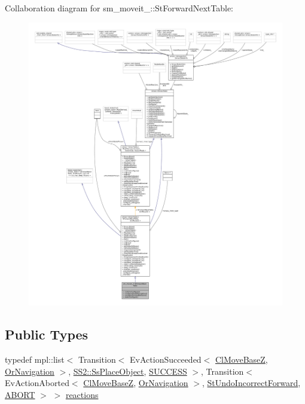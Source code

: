 Collaboration diagram for sm\+\_\+moveit\+\_\+:\+:St\+Forward\+Next\+Table\+:
\nopagebreak
\begin{figure}[H]
\begin{center}
\leavevmode
\includegraphics[width=350pt]{structsm__moveit__2_1_1StForwardNextTable__coll__graph}
\end{center}
\end{figure}
\subsection*{Public Types}
\begin{DoxyCompactItemize}
\item 
typedef mpl\+::list$<$ Transition$<$ Ev\+Action\+Succeeded$<$ \hyperlink{classcl__move__base__z_1_1ClMoveBaseZ}{Cl\+Move\+BaseZ}, \hyperlink{classsm__moveit__2_1_1OrNavigation}{Or\+Navigation} $>$, \hyperlink{structsm__moveit__2_1_1SS2_1_1SsPlaceObject}{S\+S2\+::\+Ss\+Place\+Object}, \hyperlink{classSUCCESS}{S\+U\+C\+C\+E\+SS} $>$, Transition$<$ Ev\+Action\+Aborted$<$ \hyperlink{classcl__move__base__z_1_1ClMoveBaseZ}{Cl\+Move\+BaseZ}, \hyperlink{classsm__moveit__2_1_1OrNavigation}{Or\+Navigation} $>$, \hyperlink{structsm__moveit__2_1_1StUndoIncorrectForward}{St\+Undo\+Incorrect\+Forward}, \hyperlink{classABORT}{A\+B\+O\+RT} $>$ $>$ \hyperlink{structsm__moveit__2_1_1StForwardNextTable_a3d89652380d3b90ac3baebd33e00dcee}{reactions}
\end{DoxyCompactItemize}
